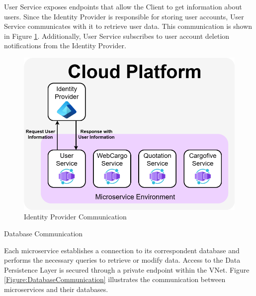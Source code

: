 \documentclass[12pt, reqno, oneside]{amsbook}
\makeatletter
\def\subsection{\@startsection{subsection}{2}%
      \z@{.5\linespacing\@plus.7\linespacing}{.25\linespacing}%
      {\normalfont\bfseries\flushleft}}
\theoremstyle{definition}
\theoremstyle{definition}
\numberwithin{section}{chapter}
\numberwithin{table}{chapter}
\numberwithin{figure}{chapter}
\makeatother
\begin{document}
User Service exposes endpoints that allow the Client to get information about users. Since the Identity Provider is responsible for storing user accounts, User Service communicates with it to retrieve user data. This communication is shown in Figure \ref{Figure:IdentityProviderCommunication}. Additionally, User Service subscribes to user account deletion notifications from the Identity Provider.

\begin{figure}[H]
  \centering
  \includegraphics[width=0.9\linewidth]{images/IdentityProviderCommunication.png}
  \caption{\label{Figure:IdentityProviderCommunication}Identity Provider Communication}
\end{figure}

\pagebreak

\subsection{Database Communication}

Each microservice establishes a connection to its correspondent database and performs the necessary queries to retrieve or modify data. Access to the Data Persistence Layer is secured through a private endpoint within the VNet. Figure \ref{Figure:DatabaseCommunication} illustrates the communication between microservices and their databases.
\end{document}

